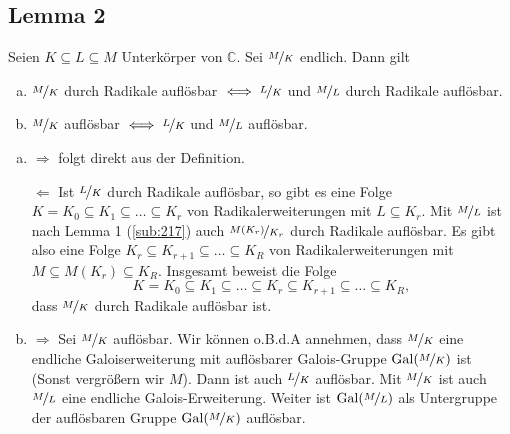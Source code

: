 
\subsection[Lemma 2: Transitivität der beiden Auflösbarkeitsbegriffe]{Lemma 2} %
\label{sub:218}
Seien $K \subseteq L \subseteq M$ Unterkörper von $\mathds{C}$. Sei $\nicefrac{M}{K}$ endlich. Dann gilt
\begin{enumerate}[a)]
	\item $\nicefrac{M}{K}$ durch Radikale auflösbar $\iff \nicefrac{L}{K}$ und $\nicefrac{M}{L}$ durch Radikale auflösbar.
	\item $\nicefrac{M}{K}$ auflösbar $\iff \nicefrac{L}{K}$ und $\nicefrac{M}{L}$ auflösbar.
\end{enumerate}
\begin{enumerate}[a)]
	\item\glqq$\Longrightarrow $\grqq{} folgt direkt aus der Definition.
	
	\glqq$\Longleftarrow$\grqq{} Ist $\nicefrac{L}{K}$ durch Radikale auflösbar, so gibt es eine Folge $K=K_0 \subseteq K_1 \subseteq \ldots \subseteq K_r$ von 
	Radikalerweiterungen mit $L \subseteq K_r$. Mit $\nicefrac{M}{L}$ ist nach Lemma 1 (\ref{sub:217}) auch $\nicefrac{M(K_r)}{K_r}$ durch Radikale auflösbar. Es gibt also
	eine Folge $K_r \subseteq K_{r+1} \subseteq \ldots \subseteq K_R$ von Radikalerweiterungen mit $M \subseteq M(K_r) \subseteq K_R$. Insgesamt beweist die Folge
	\[
		K=K_0 \subseteq K_1 \subseteq \ldots \subseteq K_r \subseteq K_{r+1} \subseteq \ldots \subseteq K_R,
	\]
	dass $\nicefrac{M}{K}$ durch Radikale auflösbar ist.
	\item \glqq$\Longrightarrow$\grqq{} Sei $\nicefrac{M}{K}$ auflösbar. Wir können o.B.d.A annehmen, dass $\nicefrac{M}{K}$ eine endliche Galoiserweiterung mit 
	auflösbarer Galois-Gruppe $\operatorname{Gal}(\nicefrac{M}{K})$ ist (Sonst vergrößern wir $M$). Dann ist auch $\nicefrac{L}{K}$ auflösbar. Mit $\nicefrac{M}{K}$ ist auch 
	$\nicefrac{M}{L}$ eine endliche Galois-Erweiterung. Weiter ist $\operatorname{Gal}(\nicefrac{M}{L})$ als Untergruppe der auflösbaren Gruppe $\operatorname{Gal}(\nicefrac{M}{K})$ auflösbar.
	
	
	

\end{enumerate}
